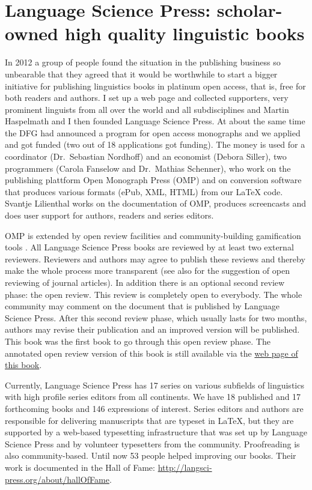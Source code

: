 \section*{Language Science Press: scholar-owned high quality linguistic books}

In 2012 a group of people found the situation in the publishing business so unbearable that they
agreed that it would be worthwhile to start a bigger initiative for publishing linguistics books in
platinum open access, that is, free for both readers and authors. I set up a web page and collected
supporters, very prominent linguists from all over the world and all subdisciplines and Martin
Haspelmath and I then founded Language Science Press. At about the same time the DFG had announced
a program for open access monographs and we applied \citep{MH2013a} and got funded (two out of 18 applications got
funding). The money is used for a coordinator (Dr.\ Sebastian Nordhoff) and an economist (Debora
Siller), two programmers (Carola Fanselow and Dr.\ Mathias Schenner), who work on the publishing
plattform Open Monograph Press (OMP) and on conversion software that produces various formats (ePub, XML,
HTML) from our \LaTeX{} code. Svantje Lilienthal works on the documentation of OMP, produces
screencasts and does user support for authors, readers and series editors.

OMP is extended by open review facilities and community-building gamification tools
\citep{MuellerOA,MH2013a}. All Language Science Press books are reviewed by at least two external
reviewers. Reviewers and authors may agree to publish these reviews and thereby make the whole
process more transparent (see also  for the suggestion of open reviewing of journal
articles). In addition there is an optional second review phase: the open
review. This review is completely open to everybody. The whole community may comment on the document
that is published by Language Science Press. After this second review phase, which usually lasts for
two months, authors may revise their publication and an improved version will be published. This
book was the first book to go through this open review phase. The annotated open review version of this book is still available via
the \href{\lsURL}{web page of this book}. 

Currently, Language Science Press has 17 series on various subfields of linguistics with high
profile series editors from all continents. We have 18 published and 17 forthcoming books and 146
expressions of interest. Series editors  and authors are responsible for
delivering manuscripts that are typeset in \LaTeX{}, but they are supported by a web-based typesetting
infrastructure that was set up by Language Science Press and by volunteer typesetters from the
community. Proofreading is also community-based. Until now 53 people helped improving our
books. Their work is documented in the Hall of Fame: \url{http://langsci-press.org/about/hallOfFame}.

